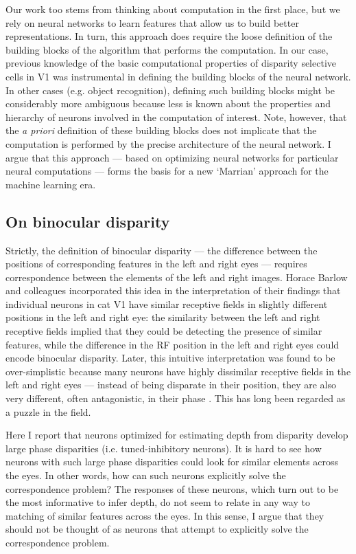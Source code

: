 Our work too stems from thinking about computation in the first place, but we rely on neural networks to learn features that allow us to build better representations. In turn, this approach does require the loose definition of the building blocks of the algorithm that performs the computation. In our case, previous knowledge of the basic computational properties of disparity selective cells in V1 was instrumental in defining the building blocks of the neural network. In other cases (e.g. object recognition), defining such building blocks might be considerably more ambiguous because less is known about the properties and hierarchy of neurons involved in the computation of interest. Note, however, that the \textit{a priori} definition of these building blocks does not implicate that the computation is performed by the precise architecture of the neural network. I argue that this approach --- based on optimizing neural networks for particular neural computations --- forms the basis for a new `Marrian' approach for the machine learning era.

\subsection*{On binocular disparity}

Strictly, the definition of binocular disparity --- the difference between the positions of corresponding features in the left and right eyes --- requires correspondence between the elements of the left and right images. Horace Barlow and colleagues \cite{Barlow:1967bs} incorporated this idea in the interpretation of their findings that individual neurons in cat V1 have similar receptive fields in slightly different positions in the left and right eye: the similarity between the left and right receptive fields implied that they could be detecting the presence of similar features, while the difference in the RF position in the left and right eyes could encode binocular disparity. Later, this intuitive interpretation was found to be over-simplistic because many neurons have highly dissimilar receptive fields in the left and right eyes --- instead of being disparate in their position, they are also very different, often antagonistic, in their phase \cite{DeAngelis:1991mb}. This has long been regarded as a puzzle in the field.

Here I report that neurons optimized for estimating depth from disparity develop large phase disparities (i.e. tuned-inhibitory neurons). It is hard to see how neurons with such large phase disparities could look for similar elements across the eyes. In other words, how can such neurons explicitly solve the correspondence problem? The responses of these neurons, which turn out to be the most informative to infer depth, do not seem to relate in any way to matching of similar features across the eyes. In this sense, I argue that they should not be thought of as neurons that attempt to explicitly solve the correspondence problem.

